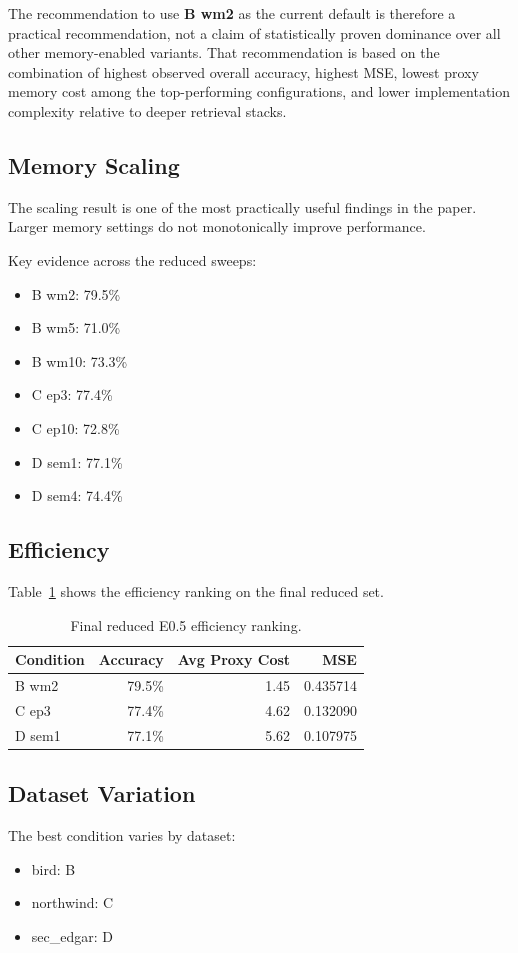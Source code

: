 \documentclass[11pt]{article}
\begin{document}
The recommendation to use \textbf{B wm2} as the current default is therefore a practical recommendation, not a claim of statistically proven dominance over all other memory-enabled variants. That recommendation is based on the combination of highest observed overall accuracy, highest MSE, lowest proxy memory cost among the top-performing configurations, and lower implementation complexity relative to deeper retrieval stacks.

\subsection{Memory Scaling}
The scaling result is one of the most practically useful findings in the paper. Larger memory settings do not monotonically improve performance.

Key evidence across the reduced sweeps:
\begin{itemize}[leftmargin=1.5em]
  \item B wm2: 79.5\%
  \item B wm5: 71.0\%
  \item B wm10: 73.3\%
  \item C ep3: 77.4\%
  \item C ep10: 72.8\%
  \item D sem1: 77.1\%
  \item D sem4: 74.4\%
\end{itemize}

\subsection{Efficiency}
Table~\ref{tab:mse} shows the efficiency ranking on the final reduced set.

\begin{table}[ht]
\centering
\begin{tabular}{lrrr}
\toprule
Condition & Accuracy & Avg Proxy Cost & MSE \\
\midrule
B wm2 & 79.5\% & 1.45 & 0.435714 \\
C ep3 & 77.4\% & 4.62 & 0.132090 \\
D sem1 & 77.1\% & 5.62 & 0.107975 \\
\bottomrule
\end{tabular}
\caption{Final reduced E0.5 efficiency ranking.}
\label{tab:mse}
\end{table}

\subsection{Dataset Variation}
The best condition varies by dataset:
\begin{itemize}[leftmargin=1.5em]
  \item bird: B
  \item northwind: C
  \item sec\_edgar: D
\end{itemize}
\end{document}
